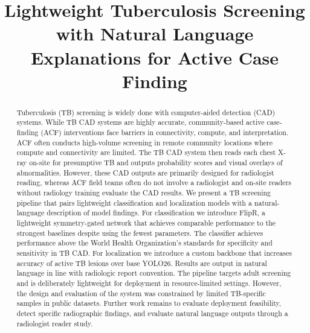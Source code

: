 \documentclass[conference, letterpaper]{IEEEtran}
\begin{document}
\title{Lightweight Tuberculosis Screening with Natural Language Explanations for Active Case Finding}

\IEEEoverridecommandlockouts
\author{
}

\maketitle

\begin{abstract} 
Tuberculosis (TB) screening is widely done with computer-aided detection (CAD) systems. While TB CAD systems are highly accurate, community-based active case-finding (ACF) interventions face barriers in connectivity, compute, and interpretation. ACF often conducts high-volume screening in remote community locations where compute and connectivity are limited. The TB CAD system then reads each chest X-ray on-site for presumptive TB and outputs probability scores and visual overlays of abnormalities. However, these CAD outputs are primarily designed for radiologist reading, whereas ACF field teams often do not involve a radiologist and on-site readers without radiology training evaluate the CAD results. We present a TB screening pipeline that pairs lightweight classification and localization models with a natural-language description of model findings. For classification we introduce FlipR, a lightweight symmetry-gated network that achieves comparable performance to the strongest baselines despite using the fewest parameters. The classifier achieves performance above the World Health Organization's standards for specificity and sensitivity in TB CAD. For localization we introduce a custom backbone that increases accuracy of active TB lesions over base YOLO26. Results are output in natural language in line with radiologic report convention. The pipeline targets adult screening and is deliberately lightweight for deployment in resource-limited settings. However, the design and evaluation of the system was constrained by limited TB-specific samples in public datasets. Further work remains to evaluate deployment feasibility, detect specific radiographic findings, and evaluate natural language outputs through a radiologist reader study.
\end{abstract}
\end{document}
